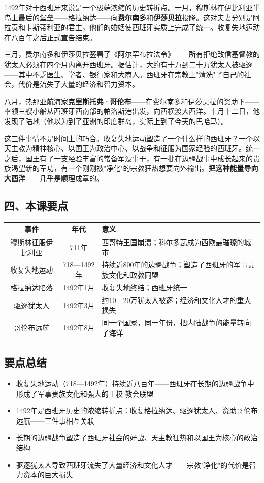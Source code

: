 \documentclass[a4paper,12pt]{ctexart}
\begin{document}
1492年对于西班牙来说是一个极端浓缩的历史转折点。一月，穆斯林在伊比利亚半岛上最后的堡垒——格拉纳达——向\textbf{费尔南多}和\textbf{伊莎贝拉}投降。这对夫妻分别是阿拉贡和卡斯蒂利亚的君主，他们的婚姻使西班牙实质上完成了统一。收复失地运动在八百年之后正式宣告结束。

三月，费尔南多和伊莎贝拉签署了《阿尔罕布拉法令》——所有拒绝改信基督教的犹太人必须在四个月内离开西班牙。据估计，大约有十万到二十万犹太人被驱逐——其中不乏医生、学者、银行家和大商人。西班牙在宗教上"清洗"了自己的社会，代价是流失了大量的经济和智力资本。

八月，热那亚航海家\textbf{克里斯托弗·哥伦布}——在费尔南多和伊莎贝拉的资助下——率领三艘小船从西班牙西南部的帕洛斯港出发，向西横渡大西洋。十月十二日，他发现了陆地（他以为到了亚洲的印度群岛，实际上到了今天的巴哈马）。

这三件事情不是时间上的巧合。收复失地运动塑造了一个什么样的西班牙？一个以天主教为精神核心、以国王为政治中心、以战争和征服为国家经验的西班牙。统一之后，国王有了一支经验丰富的常备军没事干，有一批在边疆战事中成长起来的贵族渴望新的军功，有一个刚刚被"净化"的宗教狂热想要向外输出。\textbf{把这种能量导向大西洋}——几乎是顺理成章的。

\subsection*{四、本课要点}

\begin{center}
\begin{tabular}{|c|c|p{7cm}|}
\hline
\textbf{事件} & \textbf{年代} & \textbf{意义} \\
\hline
穆斯林征服伊比利亚 & 711年 & 西哥特王国崩溃；科尔多瓦成为西欧最璀璨的城市 \\
\hline
收复失地运动 & 718—1492年 & 持续近800年的边疆战争；塑造了西班牙的军事贵族文化和政教同盟 \\
\hline
格拉纳达陷落 & 1492年1月 & 收复失地终结；西班牙统一 \\
\hline
驱逐犹太人 & 1492年3月 & 约10—20万犹太人被逐；经济和文化人才的重大损失 \\
\hline
哥伦布远航 & 1492年8月 & 同一个国家，同一年份，把内陆战争的能量转向了海洋 \\
\hline
\end{tabular}
\end{center}

\subsection*{要点总结}
\begin{itemize}
  \item 收复失地运动（718—1492年）持续近八百年——西班牙在长期的边疆战争中形成了军事贵族文化和强大的王权-教会联盟
  \item 1492年是西班牙历史的浓缩转折点：收复格拉纳达、驱逐犹太人、资助哥伦布远航——三件事相互关联
  \item 长期的边疆战争塑造了西班牙社会的好战、天主教狂热和以国王为核心的政治结构
  \item 驱逐犹太人导致西班牙流失了大量经济和文化人才——宗教"净化"的代价是智力资本的巨大损失
\end{itemize}
\end{document}
